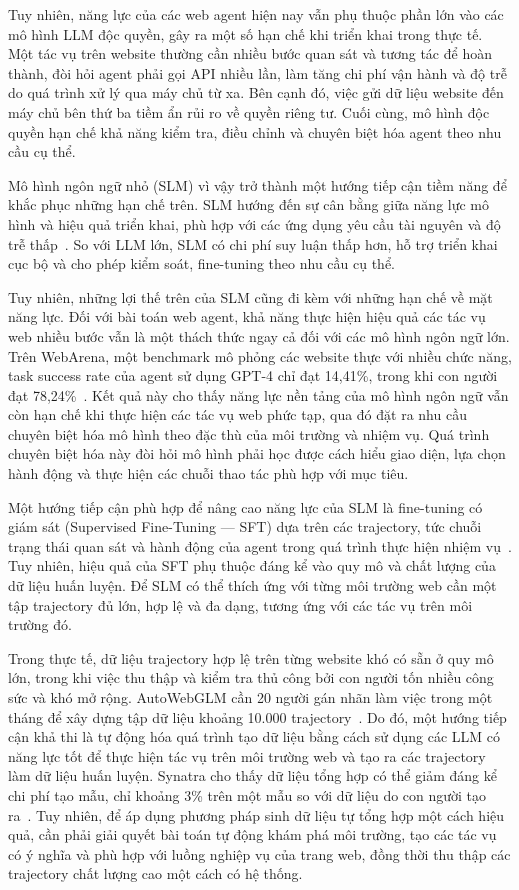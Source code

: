 Tuy nhiên, năng lực của các web agent hiện nay vẫn phụ thuộc phần lớn vào các mô hình LLM độc quyền, gây ra một số hạn chế khi triển khai trong thực tế. Một tác vụ trên website thường cần nhiều bước quan sát và tương tác để hoàn thành, đòi hỏi agent phải gọi API nhiều lần, làm tăng chi phí vận hành và độ trễ do quá trình xử lý qua máy chủ từ xa. Bên cạnh đó, việc gửi dữ liệu website đến máy chủ bên thứ ba tiềm ẩn rủi ro về quyền riêng tư. Cuối cùng, mô hình độc quyền hạn chế khả năng kiểm tra, điều chỉnh và chuyên biệt hóa agent theo nhu cầu cụ thể.

Mô hình ngôn ngữ nhỏ (SLM) vì vậy trở thành một hướng tiếp cận tiềm năng để khắc phục những hạn chế trên. SLM hướng đến sự cân bằng giữa năng lực mô hình và hiệu quả triển khai, phù hợp với các ứng dụng yêu cầu tài nguyên và độ trễ thấp~\cite{belcak2025slm}. So với LLM lớn, SLM có chi phí suy luận thấp hơn, hỗ trợ triển khai cục bộ và cho phép kiểm soát, fine-tuning theo nhu cầu cụ thể.

Tuy nhiên, những lợi thế trên của SLM cũng đi kèm với những hạn chế về mặt năng lực. Đối với bài toán web agent, khả năng thực hiện hiệu quả các tác vụ web nhiều bước vẫn là một thách thức ngay cả đối với các mô hình ngôn ngữ lớn. Trên WebArena, một benchmark mô phỏng các website thực với nhiều chức năng, task success rate của agent sử dụng GPT-4 chỉ đạt 14{,}41\%, trong khi con người đạt 78{,}24\%~\cite{zhou2024webarena}. Kết quả này cho thấy năng lực nền tảng của mô hình ngôn ngữ vẫn còn hạn chế khi thực hiện các tác vụ web phức tạp, qua đó đặt ra nhu cầu chuyên biệt hóa mô hình theo đặc thù của môi trường và nhiệm vụ. Quá trình chuyên biệt hóa này đòi hỏi mô hình phải học được cách hiểu giao diện, lựa chọn hành động và thực hiện các chuỗi thao tác phù hợp với mục tiêu.

Một hướng tiếp cận phù hợp để nâng cao năng lực của SLM là fine-tuning có giám sát (Supervised Fine-Tuning — SFT) dựa trên các trajectory, tức chuỗi trạng thái quan sát và hành động của agent trong quá trình thực hiện nhiệm vụ~\cite{lai2024autowebglm}. Tuy nhiên, hiệu quả của SFT phụ thuộc đáng kể vào quy mô và chất lượng của dữ liệu huấn luyện. Để SLM có thể thích ứng với từng môi trường web cần một tập trajectory đủ lớn, hợp lệ và đa dạng, tương ứng với các tác vụ trên môi trường đó.

Trong thực tế, dữ liệu trajectory hợp lệ trên từng website khó có sẵn ở quy mô lớn, trong khi việc thu thập và kiểm tra thủ công bởi con người tốn nhiều công sức và khó mở rộng. AutoWebGLM cần 20 người gán nhãn làm việc trong một tháng để xây dựng tập dữ liệu khoảng 10.000 trajectory~\cite{lai2024autowebglm}. Do đó, một hướng tiếp cận khả thi là tự động hóa quá trình tạo dữ liệu bằng cách sử dụng các LLM có năng lực tốt để thực hiện tác vụ trên môi trường web và tạo ra các trajectory làm dữ liệu huấn luyện. Synatra cho thấy dữ liệu tổng hợp có thể giảm đáng kể chi phí tạo mẫu, chỉ khoảng 3\% trên một mẫu so với dữ liệu do con người tạo ra~\cite{ou2024synatra}. Tuy nhiên, để áp dụng phương pháp sinh dữ liệu tự tổng hợp một cách hiệu quả, cần phải giải quyết bài toán tự động khám phá môi trường, tạo các tác vụ có ý nghĩa và phù hợp với luồng nghiệp vụ của trang web, đồng thời thu thập các trajectory chất lượng cao một cách có hệ thống.

